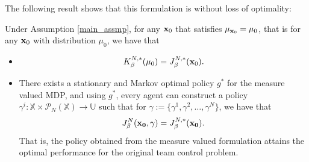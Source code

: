 \documentclass[twoside,11pt]{article}
\def\P{{\mathcal P}}
\begin{document}
The following result shows that this formulation is without loss of optimality:
\begin{theorem}
Under Assumption \ref{main_assmp}, for any ${\bf x}_0$ that satisfies $\mu_{{\bf x}_0}=\mu_0$, that is for any ${\bf x}_0$ with distribution $\mu_0$, we have that
\begin{itemize}
\item[i.)]
\begin{align*}
K_\beta^{N,*}(\mu_{0})=J_\beta^{N,*}({\bf x}_0).
\end{align*}

\item[ii.)] There exists a stationary and Markov optimal policy $g^*$ for the measure valued MDP, and  using $g^*$, every agent can construct a policy $\gamma^i:\mathds{X}\times \P_N(\mathds{X})\to\mathds{U}$ such that for $\gamma:=\{\gamma^1,\gamma^2,\dots,\gamma^N\}$, we have that
\begin{align*}
J^N_\beta({\bf x_0},\gamma)=J_\beta^{N,*}({\bf x_0}).
\end{align*}
That is, the policy obtained from the measure valued formulation attains the optimal performance for the original team control problem.
\end{itemize}
\end{theorem} 
\end{document}
